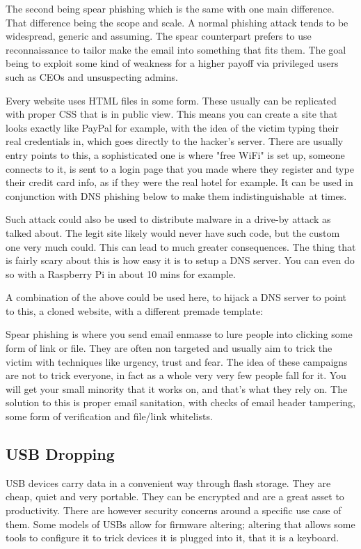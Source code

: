 The second being spear phishing which is the same with one main difference. That difference being the scope and scale. A normal phishing attack tends to be widespread, generic and assuming. The spear counterpart prefers to use reconnaissance to tailor make the email into something that fits them. The goal being to exploit some kind of weakness for a higher payoff via privileged users such as CEOs and unsuspecting admins.

Every website uses HTML files in some form. These usually can be replicated with proper CSS that is in public view. This means you can create a site that looks exactly like PayPal for example, with the idea of the victim typing their real credentials in, 
which goes directly to the hacker's server. There are usually entry points to this, a sophisticated one is where "free WiFi" is set up, someone connects to it, is sent to a login page that you made where they register and type their credit card info, 
as if they were the real hotel for example. It can be used in conjunction with DNS phishing below to make them indistinguishable at times.

Such attack could also be used to distribute malware in a drive-by attack as talked about. The legit site likely would never have such code, but the custom one very much could. This can lead to much greater consequences. The thing that is fairly scary about this is how easy it is to setup a DNS server. You can even do so with a Raspberry Pi in about 10 mins for example.

A combination of the above could be used here, to hijack a DNS server to point to this, a cloned website, with a different premade template:

Spear phishing is where you send email enmasse to lure people into clicking some form of link or file. They are often non targeted and usually aim to trick the victim with techniques like urgency, trust and fear. The idea of these campaigns are not to trick everyone, 
in fact as a whole very very few people fall for it. You will get your small minority that it works on, and that's what they rely on. The solution to this is proper email sanitation, with checks of email header tampering, some form of verification and file/link whitelists.

\subsection{USB Dropping}
USB devices carry data in a convenient way through flash storage. They are cheap, quiet and very portable. They can be encrypted and are a great asset to productivity. 
There are however security concerns around a specific use case of them. Some models of USBs allow for firmware altering; altering that allows some tools to configure it to trick
devices it is plugged into it, that it is a keyboard. 

